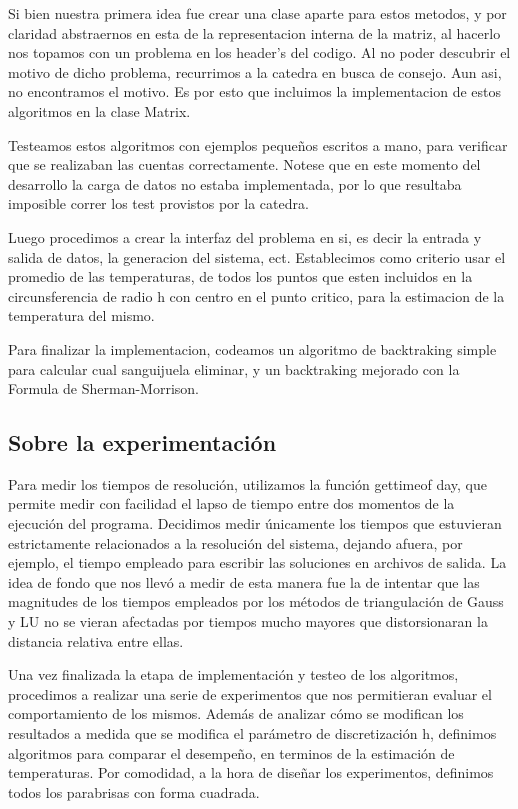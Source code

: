 Si bien nuestra primera idea fue crear una clase aparte para estos metodos, y por claridad abstraernos en esta de la 
representacion interna de la matriz, al hacerlo nos topamos con un problema en los header's del codigo. Al no poder descubrir el motivo
de dicho problema, recurrimos a la catedra en busca de consejo. Aun asi, no encontramos el motivo. Es por esto que incluimos la implementacion de
estos algoritmos en la clase Matrix. 

Testeamos estos algoritmos con ejemplos peque\~nos escritos a mano, para verificar que se realizaban las cuentas correctamente. Notese que en 
este momento del desarrollo la carga de datos no estaba implementada, por lo que resultaba imposible correr los test provistos por la catedra.

Luego procedimos a crear la interfaz del problema en si, es decir la entrada y salida de datos, la generacion
del sistema, ect. Establecimos como criterio usar el promedio de las temperaturas, de todos los puntos que esten
incluidos en la circunsferencia de radio h con centro en el punto critico,
para la estimacion de la temperatura del mismo. 

Para finalizar la implementacion, codeamos un algoritmo de backtraking simple para calcular cual sanguijuela eliminar,
y un backtraking mejorado con la Formula de Sherman-Morrison. 



\subsection{Sobre la experimentaci\'on}

Para medir los tiempos de resoluci\'on, utilizamos la funci\'on gettimeof day, que permite medir con
facilidad el lapso de tiempo entre dos momentos de la ejecuci\'on del programa. Decidimos medir
\'unicamente los tiempos que estuvieran estrictamente relacionados a la resoluci\'on del sistema,
dejando afuera, por ejemplo, el tiempo empleado para escribir las soluciones en archivos de salida. La
idea de fondo que nos llev\'o a medir de esta manera fue la de intentar que las magnitudes de los tiempos
empleados por los m\'etodos de triangulaci\'on de Gauss y LU no se vieran afectadas por tiempos mucho
mayores que distorsionaran la distancia relativa entre ellas.

Una vez finalizada la etapa de implementaci\'on y testeo de los algoritmos, procedimos a realizar una
serie de experimentos que nos permitieran evaluar el comportamiento de los mismos. Adem\'as de
analizar c\'omo se modifican los resultados a medida que se modifica el par\'ametro de discretizaci\'on
h, definimos algoritmos para comparar el desempe\~no, en terminos de la estimaci\'on de temperaturas.
Por comodidad, a la hora de dise\~nar los experimentos, definimos todos los parabrisas con forma cuadrada.

